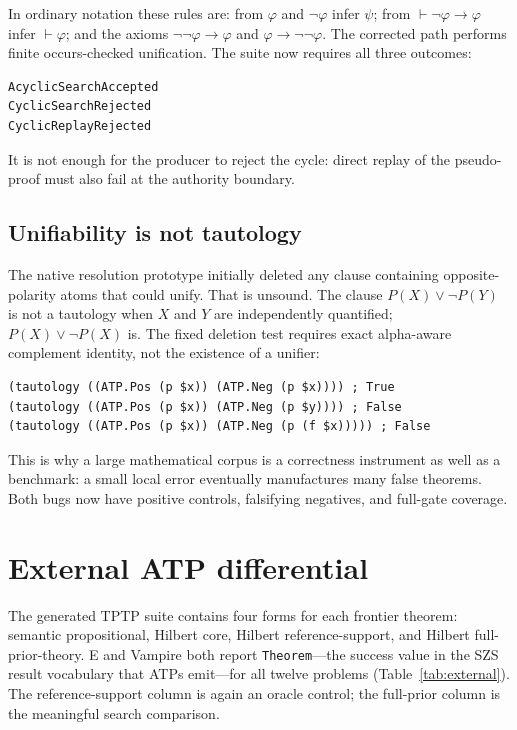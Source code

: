 \documentclass[10pt]{article}
\begin{document}
In ordinary notation these rules are: from $\varphi$ and $\neg\varphi$ infer
$\psi$; from $\vdash\neg\varphi\to\varphi$ infer $\vdash\varphi$; and the
axioms $\neg\neg\varphi\to\varphi$ and $\varphi\to\neg\neg\varphi$.
The corrected path performs finite occurs-checked unification.  The suite now
requires all three outcomes:

\begin{lstlisting}
AcyclicSearchAccepted
CyclicSearchRejected
CyclicReplayRejected
\end{lstlisting}

It is not enough for the producer to reject the cycle: direct replay of the
pseudo-proof must also fail at the authority boundary.

\subsection{Unifiability is not tautology}

The native resolution prototype initially deleted any clause containing
opposite-polarity atoms that could unify.  That is unsound.  The clause
$P(X)\lor\neg P(Y)$ is not a tautology when $X$ and $Y$ are independently
quantified; $P(X)\lor\neg P(X)$ is.  The fixed deletion test requires exact
alpha-aware complement identity, not the existence of a unifier:

\begin{lstlisting}
(tautology ((ATP.Pos (p $x)) (ATP.Neg (p $x)))) ; True
(tautology ((ATP.Pos (p $x)) (ATP.Neg (p $y)))) ; False
(tautology ((ATP.Pos (p $x)) (ATP.Neg (p (f $x))))) ; False
\end{lstlisting}

This is why a large mathematical corpus is a correctness instrument as well
as a benchmark: a small local error eventually manufactures many false
theorems.  Both bugs now have positive controls, falsifying negatives, and
full-gate coverage.

\section{External ATP differential}

The generated TPTP suite contains four forms for each frontier theorem:
semantic propositional, Hilbert core, Hilbert reference-support, and Hilbert
full-prior-theory.  E and Vampire both report \texttt{Theorem}---the success
value in the SZS result vocabulary that ATPs emit---for all twelve
problems (Table~\ref{tab:external}).  The reference-support column is again an
oracle control; the full-prior column is the meaningful search comparison.
\end{document}

